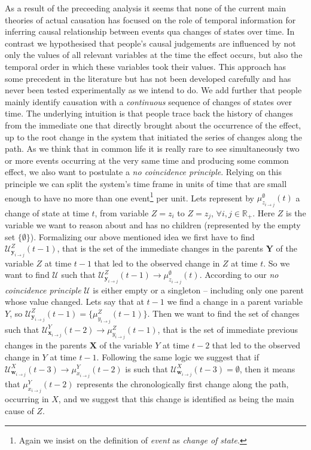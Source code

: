 \documentclass[10pt,letterpaper]{article}
\begin{document}
As a result of the preceeding analysis it seems that none of the current main theories of actual causation has focused on the role of temporal information for inferring causal relationship between events qua changes of states over time. In contrast we hypothesised that people's causal judgements are influenced by not only the values of all relevant variables at the time the effect occurs, but also the temporal order in which these variables took their values. This approach has some precedent in the literature but has not been developed carefully and has never been tested experimentally as we intend to do. We add further that people mainly identify causation with a \textit{continuous} sequence of changes of states over time. The underlying intuition is that people trace back the history of changes from the immediate one that directly brought about the occurrence of the effect, up to the root change in the system that initiated the series of changes along the path. As we think that in common life it is really rare to see simultaneously two or more events occurring at the very same time and producing some common effect, we also want to postulate a \textit{no coincidence principle}. Relying on this principle we can split the system's time frame in units of time that are small enough to have no more than one event\footnote{Again we insist on the definition of \textit{event} as \textit{change of state}.} per unit. Lets represent by $\mu^{\emptyset}_{z_{i\rightarrow j}}(t)$ a change of state at time $t$, from variable $Z=z_i$ to $Z=z_j$, $\forall i,j\in \mathds{R}_+$. Here $Z$ is the variable we want to reason about and has no children (represented by the empty set $\{\emptyset\}$). Formalizing our above mentioned idea we first have to find $\mathcal{U}^Z_{\bm{y}_{i\rightarrow j}}(t-1)$, that is the set of the immediate changes in the parents $\bm{Y}$ of the variable $Z$ at time $t-1$ that led to the observed change in $Z$ at time $t$. So we want to find $\mathcal{U}$ such that $\mathcal{U}^Z_{\bm{y}_{i\rightarrow j}}(t-1)\rightarrow \mu^{\emptyset}_{z_{i\rightarrow j}}(t)$. According to our \textit{no coincidence principle} $\mathcal{U}$ is either empty or a singleton -- including only one parent whose value changed. Lets say that at $t-1$ we find a change in a parent variable $Y$, so $\mathcal{U}^Z_{\bm{y}_{i\rightarrow j}}(t-1)=\{\mu^{Z}_{y_{i\rightarrow j}}(t-1)\}$. Then we want to find the set of changes such that $\mathcal{U}^Y_{\bm{x}_{i\rightarrow j}}(t-2)\rightarrow \mu^{Z}_{y_{i\rightarrow j}}(t-1)$, that is the set of immediate previous changes in the parents $\bm{X}$ of the variable $Y$ at time $t-2$ that led to the observed change in $Y$ at time $t-1$. Following the same logic we suggest that if $\mathcal{U}^X_{\bm{w}_{i\rightarrow j}}(t-3)\rightarrow \mu^{Y}_{x_{i\rightarrow j}}(t-2)$ is such that $\mathcal{U}^X_{\bm{w}_{i\rightarrow j}}(t-3)=\emptyset$, then it means that $\mu^{Y}_{x_{i\rightarrow j}}(t-2)$ represents the chronologically first change along the path, occurring in $X$, and we suggest that this change is identified as being the main cause of $Z$.
\end{document}
